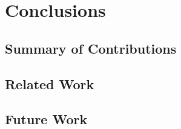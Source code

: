 \documentclass[a4paper,10pt]{report}
\begin{document}
\chapter{Conclusions}
\label{conclusions-chapter}


\section{Summary of Contributions}


\section{Related Work}


\section{Future Work}

\raggedright
\printbibliography
\end{document}
